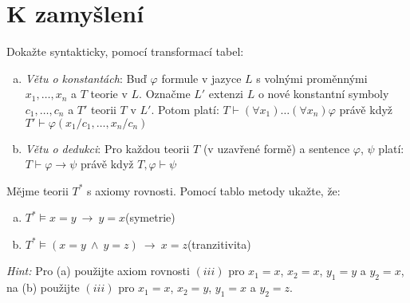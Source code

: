 \section*{K zamyšlení}


\begin{problem} 
    
    Dokažte syntakticky, pomocí transformací tabel:
    \begin{enumerate}[(a)]
        \item \emph{Větu o konstantách}: Buď $\varphi$ formule v jazyce $L$ s volnými proměnnými $x_1,\dots,x_n$ a $T$ teorie v $L$. Označme $L'$ extenzi $L$ o nové konstantní symboly $c_1,\dots,c_n$ a $T'$ teorii $T$ v $L'$. Potom platí:
        $T \vdash (\forall x_1)\dots(\forall x_n)\varphi$ právě když $T'\vdash\varphi(x_1/c_1,\dots,x_n/c_n)$
        \item \emph{Větu o dedukci}: Pro každou teorii $T$ (v uzavřené formě) a sentence $\varphi$, $\psi$ platí: $T\vdash \varphi\to\psi$ právě když $T,\varphi\vdash\psi$
    \end{enumerate}

\end{problem}


\begin{problem} 
    
    Mějme teorii $T^*$ s axiomy rovnosti. Pomocí tablo metody ukažte, že:
    \begin{enumerate}[(a)]
        \item $T^*\models x=y\ \to\ y=x$\hfill(symetrie)
        \item $T^*\models (x=y\ \wedge\ y=z)\ \to\ x=z$\hfill(tranzitivita)
    \end{enumerate}
    {\it Hint:} Pro (a) použijte axiom rovnosti $(iii)$ pro $x_1=x$, $x_2=x$, $y_1=y$ a $y_2=x$, \newline
        na (b) použijte $(iii)$ pro $x_1=x$, $x_2=y$, $y_1=x$ a $y_2=z$.
        
\end{problem}
  



